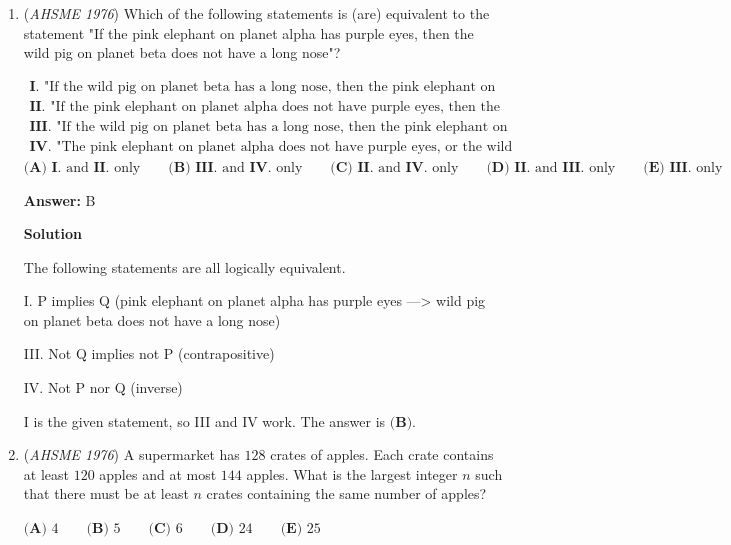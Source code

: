 \begin{enumerate}
	\item (\textit{AHSME 1976}) Which of the following statements is (are) equivalent to the statement 
"If the pink elephant on planet alpha has purple eyes, then the wild pig on planet beta does not have a long nose"?


 $\begin{array}{l}\textbf{I. }\text{"If the wild pig on planet beta has a long nose, then the pink elephant on planet alpha has purple eyes."}\\ \textbf{II. }\text{"If the pink elephant on planet alpha does not have purple eyes, then the wild pig on planet beta does not have a long nose."}\\ \textbf{III. }\text{"If the wild pig on planet beta has a long nose, then the pink elephant on planet alpha does not have purple eyes."}\\ \textbf{IV. }\text{"The pink elephant on planet alpha does not have purple eyes, or the wild pig on planet beta does not have a long nose."}\end{array}$
$\textbf{(A) }\textbf{I. }\text{and }\textbf{II. }\text{only}\qquad \textbf{(B) }\textbf{III. }\text{and }\textbf{IV. }\text{only}\qquad \textbf{(C) }\textbf{II. }\text{and }\textbf{IV. }\text{only}\qquad \textbf{(D) }\textbf{II. }\text{and }\textbf{III. }\text{only}\qquad \textbf{(E) }\textbf{III. }\text{only}$

 \textbf{Answer: }B



\textbf{Solution}

The following statements are all logically equivalent.

 I. P implies Q (pink elephant on planet alpha has purple eyes ---> wild pig on planet beta does not have a long nose)

 
III. Not Q implies not P (contrapositive)

 IV. Not P nor Q (inverse)

 
I is the given statement, so III and IV work. The answer is $\boxed{\textbf{(B)}}.$



	\item (\textit{AHSME 1976}) A supermarket has $128$ crates of apples. Each crate contains at least $120$ apples and at most $144$ apples. 
What is the largest integer $n$ such that there must be at least $n$ crates containing the same number of apples?


 $\textbf{(A) }4\qquad \textbf{(B) }5\qquad \textbf{(C) }6\qquad \textbf{(D) }24\qquad  \textbf{(E) }25$


\end{enumerate}
